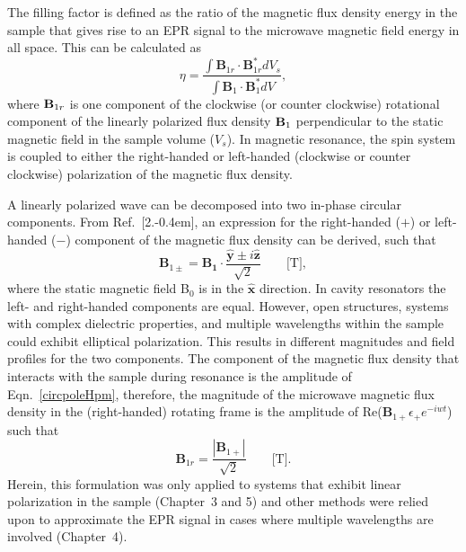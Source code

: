 The filling factor is defined as the ratio of the magnetic flux density energy in the sample that gives rise to an EPR signal to the microwave magnetic field energy in all space. This can be calculated as
\begin{equation}
 \eta = \frac{\int {\mathbf B}_{1r} \cdot {\mathbf B}_{1r}^* dV_s}{\int {\mathbf B}_1 \cdot {\mathbf B}_1^* dV}, \label{eq-2:filling}
\end{equation}
where ${\textbf B}_{1r}$ is one component of the clockwise (or counter clockwise) rotational component of the linearly polarized flux density ${\textbf B}_1$ perpendicular to the static magnetic field in the sample volume ($V_s$). \cite{jackson1975classical} In magnetic resonance, the spin system is coupled to either the right-handed or left-handed (clockwise or counter clockwise) polarization of the magnetic flux density. \cite{abragam1961}

A linearly polarized wave can be decomposed into two in-phase circular components. From Ref.~[2.\kern-0.4em], an expression for the right-handed ($+$) or left-handed ($-$) component of the magnetic flux density can be derived, such that
\begin{equation}
    \mathbf{B}_{1\pm} =  \mathbf{B_1}\cdot\frac{\mathbf{\hat{y}} \pm i\mathbf{\hat{z}}}{\sqrt{2}} \qquad \text{[T]}, \label{circpoleHpm}
\end{equation}
where the static magnetic field B$_0$ is in the $\mathbf{\hat{x}}$ direction. In cavity resonators the left- and right-handed components are equal. However, open structures, systems with complex dielectric properties, and multiple wavelengths within the sample could exhibit elliptical polarization. This results in different magnitudes and field profiles for the two components. The component of the magnetic flux density that interacts with the sample during resonance is the amplitude of Eqn.~\ref{circpoleHpm}, therefore, the magnitude of the microwave magnetic flux density in the (right-handed) rotating frame is the amplitude of Re($\mathbf{B}_{1+}\epsilon_+e^{-iwt}$) such that
\begin{equation}
    \mathbf{B}_{1r} =  \frac{|\mathbf{B}_{1+}|}{\sqrt{2}} \qquad \text{[T]}. \label{circpoleH}
\end{equation}
Herein, this formulation was only applied to systems that exhibit linear polarization in the sample (Chapter~3 and 5) and other methods were relied upon to approximate the EPR signal in cases where multiple wavelengths are involved (Chapter~4).

